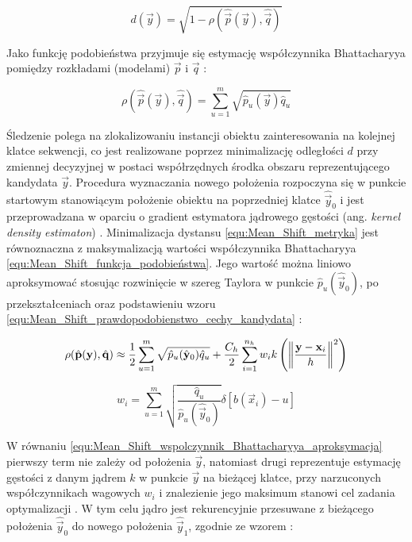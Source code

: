 \begin{equation}
\label{equ:Mean_Shift_metryka}
	d(\vec{y}) =  \sqrt{1 - \rho(\hat{\vec{p}}(\vec{y}), \hat{\vec{q}})}
\end{equation}

Jako funkcję podobieństwa przyjmuje się estymację współczynnika Bhattacharyya pomiędzy rozkładami (modelami) $\vec{p}$ i $\vec{q}$ \cite{Comaniciu2003}:

\begin{equation}
\label{equ:Mean_Shift_funkcja_podobieństwa}
	\rho(\hat{\vec{p}}(\vec{y}), \hat{\vec{q}}) = \sum_{u=1}^m \sqrt{\hat{p}_u(\vec{y}) \hat{q}_u}
\end{equation}

Śledzenie polega na zlokalizowaniu instancji obiektu zainteresowania na kolejnej klatce sekwencji, co jest realizowane poprzez minimalizację odległości $d$ przy zmiennej decyzyjnej w postaci współrzędnych środka obszaru reprezentującego kandydata $\vec{y}$. Procedura wyznaczania nowego położenia rozpoczyna się w punkcie startowym stanowiącym położenie obiektu na poprzedniej klatce $\hat{\vec{y}}_0$ i jest przeprowadzana w oparciu o gradient estymatora jądrowego gęstości (ang. \textit{kernel density estimaton}) \cite{Comaniciu2003}. Minimalizacja dystansu \ref{equ:Mean_Shift_metryka} jest równoznaczna z maksymalizacją wartości współczynnika Bhattacharyya \ref{equ:Mean_Shift_funkcja_podobieństwa}. Jego wartość można liniowo aproksymować stosując rozwinięcie w szereg Taylora w punkcie $\hat{p}_u(\hat{\vec{y}}_0)$, po przekształceniach oraz podstawieniu wzoru \ref{equ:Mean_Shift_prawdopodobienstwo_cechy_kandydata} \cite{Comaniciu2003}:

\begin{equation}
\label{equ:Mean_Shift_wspolczynnik_Bhattacharyya_aproksymacja}
	\rho(\hat{\vec{p}}(\vec{y}), \hat{\vec{q}}) \approx \frac{1}{2}\sum_{u=1}^m \sqrt{\hat{p}_u(\hat{\vec{y}}_0) \hat{q}_u} + \frac{C_h}{2} \sum_{i=1}^{n_h} w_i k\left(\norm[\bigg]{\frac{\vec{y} - \vec{x}_i}{h}}^2\right)
\end{equation}

\begin{equation}
\label{equ:Mean_Shift_wagi}
	w_i = \sum_{u=1}^m \sqrt{\frac{\hat{q}_u}{\hat{p}_u(\hat{\vec{y}}_0)}} \delta[ b(\vec{x}_i) - u]
\end{equation}

W równaniu \ref{equ:Mean_Shift_wspolczynnik_Bhattacharyya_aproksymacja} pierwszy term nie zależy od położenia $\vec{y}$, natomiast drugi reprezentuje estymację gęstości z danym jądrem $k$ w punkcie $\vec{y}$ na bieżącej klatce, przy narzuconych współczynnikach wagowych $w_i$ i znalezienie jego maksimum stanowi cel zadania optymalizacji \cite{Comaniciu2003}. W tym celu jądro jest rekurencyjnie przesuwane z bieżącego położenia $\hat{\vec{y}}_0$ do nowego położenia $\hat{\vec{y}}_1$, zgodnie ze wzorem \cite{Comaniciu2003}:

